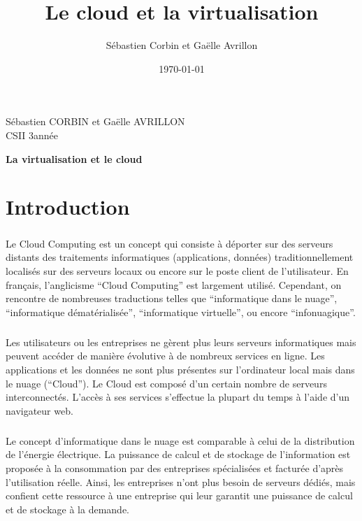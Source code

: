 \documentclass[a4paper,12pt]{report}
\title{Le cloud et la virtualisation}
\author{Sébastien Corbin et Gaëlle Avrillon}
\date{\today}
\begin{document}
\begin{onehalfspace}

		\begin{titlepage}
			\begin{center}
				Sébastien CORBIN et Gaëlle AVRILLON\\
				CSII 3\ieme année\\
			\end{center}
			\hrulefill
			\vspace{7cm}
			\begin{center} 
				\LARGE \textbf{La virtualisation et le cloud}\\
			\end{center}
		\end{titlepage}
		\newpage

		\setcounter{page}{1}
		\thispagestyle{empty}
		\newpage

	\chapter*{Introduction}
	
	\paragraph*{}
	Le Cloud Computing est un concept qui consiste à déporter sur des serveurs distants des traitements informatiques (applications, données) traditionnellement localisés sur des serveurs locaux ou encore sur le poste client de l’utilisateur. En français, l’anglicisme “Cloud Computing” est largement utilisé. Cependant, on rencontre de nombreuses traductions telles que “informatique dans le nuage”, “informatique dématérialisée”, “informatique virtuelle”, ou encore “infonuagique”.

	\paragraph*{}
	Les utilisateurs ou les entreprises ne gèrent plus leurs serveurs informatiques mais peuvent accéder de manière évolutive à de nombreux services en ligne. Les applications et les données ne sont plus présentes sur l’ordinateur local mais dans le nuage (“Cloud”). Le Cloud est composé d’un certain nombre de serveurs interconnectés. L’accès à ses services s’effectue la plupart du temps à l’aide d’un navigateur web.
	
	\paragraph*{}
	Le concept d'informatique dans le nuage est comparable à celui de la distribution de l'énergie électrique. La puissance de calcul et de stockage de l'information est proposée à la consommation par des entreprises spécialisées et facturée d'après l'utilisation réelle. Ainsi, les entreprises n'ont plus besoin de serveurs dédiés, mais confient cette ressource à une entreprise qui leur garantit une puissance de calcul et de stockage à la demande.
	

\end{onehalfspace}
\end{document}
